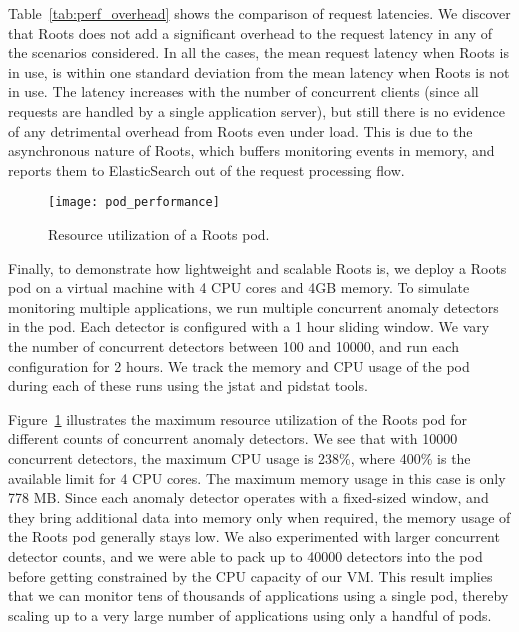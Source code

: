 Table~\ref{tab:perf_overhead} shows the comparison of request 
latencies. We discover that Roots does not add a significant overhead
to the request latency in any of the scenarios considered. In all the cases,
the mean request latency when Roots is in use, is within one standard deviation
from the mean latency when Roots is not in use. 
The latency increases with the number of concurrent clients
(since all requests are handled by a single
application server), but still there is no evidence of any detrimental overhead
from Roots even under load. This is due to the asynchronous nature of Roots,
which buffers monitoring events in memory, and reports them to ElasticSearch
out of the request processing flow.

\begin{figure}
\centering
\texttt{[image: pod\_performance]}
\caption{Resource utilization of a Roots pod.}
\label{fig:pod_performance}
\end{figure}

Finally, to demonstrate how lightweight and scalable Roots is, we deploy
a Roots pod on a virtual machine with 4 CPU cores and 4GB memory.
To simulate monitoring multiple applications, we run multiple concurrent anomaly
detectors in the pod. Each detector is configured with a 1 hour sliding window.
We vary the number of concurrent
detectors between 100 and 10000, and run each configuration for
2 hours. We track the memory and CPU usage of the
pod during each of these runs using the jstat and pidstat tools. 

Figure~\ref{fig:pod_performance}
illustrates the maximum resource utilization of the Roots pod for different counts of
concurrent anomaly detectors. We see that with 10000 concurrent
detectors, the maximum CPU usage is 238\%, where 400\% is the available limit
for 4 CPU cores. The maximum memory usage in this case is only 778 MB. 
Since each anomaly detector operates with a fixed-sized window, and they
bring additional data into memory only when required, the memory
usage of the Roots pod generally stays low. 
We also experimented with larger concurrent
detector counts, and we were able to pack up to 40000 detectors into the pod before
getting constrained by the CPU capacity of our VM.
This result implies that we can monitor tens of thousands 
of applications using a single pod, thereby scaling up to a very large number
of applications using only a handful of pods.
